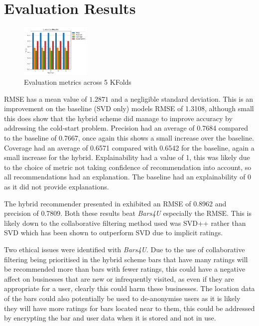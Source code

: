 \documentclass[conference]{IEEEtran}
\begin{document}
\section{Evaluation Results}
\begin{figure}[h]
    \centering
    \includegraphics[width=0.3\textwidth]{result_graph}
    \caption{Evaluation metrics across 5 KFolds}
    \label{fig:res}
\end{figure}
RMSE has a mean value of $1.2871$ and a negligible standard deviation. This is an improvement on the baseline (SVD only) models RMSE of 1.3108, although small this does show that the hybrid scheme did manage to improve accuracy by addressing the cold-start problem. Precision had an average of 0.7684 compared to the baseline of 0.7667, once again this shows a small increase over the baseline. Coverage had an average of 0.6571 compared with 0.6542 for the baseline, again a small increase for the hybrid. Explainability had a value of 1, this was likely due to the choice of metric not taking confidence of recommendation into account, so all recommendations had an explanation. The baseline had an explainability of 0 as it did not provide explanations.
\par
The hybrid recommender presented in\cite{b15} exhibited an RMSE of 0.8962 and precision of 0.7809. Both these results beat \textit{Bars4U} especially the RMSE. This is likely down to the collaborative filtering method used was SVD++ rather than SVD which has been shown to outperform SVD due to implicit ratings\cite{b15}.
\par
Two ethical issues were identified with \textit{Bars4U}. Due to the use of collaborative filtering being prioritised in the hybrid scheme bars that have many ratings will be recommended more than bars with fewer ratings, this could have a negative affect on businesses that are new or infrequently visited, as even if they are appropriate for a user, clearly this could harm these businesses. The location data of the bars could also potentially be used to de-anonymise users as it is likely they will have more ratings for bars located near to them, this could be addressed by encrypting the bar and user data when it is stored and not in use.
\end{document}
